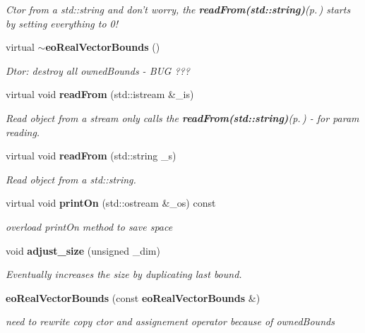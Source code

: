 \begin{CompactItemize}
\begin{CompactList}\small\item\em Ctor from a std::string and don't worry, the {\bf read\-From(std::string)}{\rm (p.\,\pageref{classeo_real_vector_bounds_a8})} starts by setting everything to 0! \item\end{CompactList}\item 
virtual {\bf $\sim$eo\-Real\-Vector\-Bounds} ()\label{classeo_real_vector_bounds_a6}

\begin{CompactList}\small\item\em Dtor: destroy all owned\-Bounds - BUG ??? \item\end{CompactList}\item 
virtual void {\bf read\-From} (std::istream \&\_\-is)
\begin{CompactList}\small\item\em Read object from a stream only calls the {\bf read\-From(std::string)}{\rm (p.\,\pageref{classeo_real_vector_bounds_a8})} - for param reading. \item\end{CompactList}\item 
virtual void {\bf read\-From} (std::string \_\-s)
\begin{CompactList}\small\item\em Read object from a std::string. \item\end{CompactList}\item 
virtual void {\bf print\-On} (std::ostream \&\_\-os) const \label{classeo_real_vector_bounds_a9}

\begin{CompactList}\small\item\em overload print\-On method to save space \item\end{CompactList}\item 
void {\bf adjust\_\-size} (unsigned \_\-dim)\label{classeo_real_vector_bounds_a10}

\begin{CompactList}\small\item\em Eventually increases the size by duplicating last bound. \item\end{CompactList}\item 
{\bf eo\-Real\-Vector\-Bounds} (const {\bf eo\-Real\-Vector\-Bounds} \&)\label{classeo_real_vector_bounds_a11}

\begin{CompactList}\small\item\em need to rewrite copy ctor and assignement operator because of owned\-Bounds \item\end{CompactList}\end{CompactItemize}
